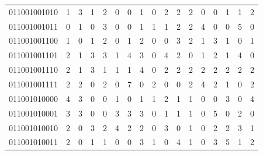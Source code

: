 \documentclass[10pt,a4paper]{article}
\begin{document}
\begin{longtable}{ |c|c|c|c|c|c|c|c|c|c|c|c|c|c|c|c|c| }
    011001001010              & 1                            & 3                                & 1                            & 2                              & 0   & 0   & 1   & 0   & 2   & 2   & 2   & 0   & 0   & 1   & 1   & 2   \\
    011001001011              & 0                            & 1                                & 0                            & 3                              & 0   & 0   & 1   & 1   & 1   & 2   & 2   & 4   & 0   & 0   & 5   & 0   \\
    011001001100              & 1                            & 0                                & 1                            & 2                              & 0   & 1   & 2   & 0   & 0   & 3   & 2   & 1   & 3   & 1   & 0   & 1   \\
    011001001101              & 2                            & 1                                & 3                            & 3                              & 1   & 4   & 3   & 0   & 4   & 2   & 0   & 1   & 2   & 1   & 4   & 0   \\
    011001001110              & 2                            & 1                                & 3                            & 1                              & 1   & 1   & 4   & 0   & 2   & 2   & 2   & 2   & 2   & 2   & 2   & 2   \\
    011001001111              & 2                            & 2                                & 0                            & 2                              & 0   & 7   & 0   & 2   & 0   & 0   & 2   & 4   & 2   & 1   & 0   & 2   \\
    011001010000              & 4                            & 3                                & 0                            & 0                              & 1   & 0   & 1   & 1   & 2   & 1   & 1   & 0   & 0   & 3   & 0   & 4   \\
    011001010001              & 3                            & 3                                & 0                            & 0                              & 3   & 3   & 3   & 0   & 1   & 1   & 1   & 0   & 5   & 0   & 2   & 0   \\
    011001010010              & 2                            & 0                                & 3                            & 2                              & 4   & 2   & 2   & 0   & 3   & 0   & 1   & 0   & 2   & 2   & 3   & 1   \\
    011001010011              & 2                            & 0                                & 1                            & 1                              & 0   & 0   & 3   & 1   & 0   & 4   & 1   & 0   & 3   & 5   & 1   & 2   \\

\end{longtable}
\end{document}

